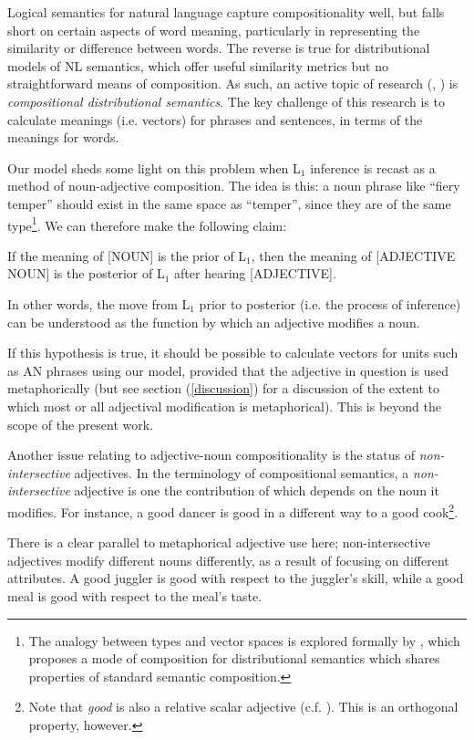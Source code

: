 \documentclass[10pt,letterpaper,twocolumn]{article}
\begin{document}
Logical semantics for natural language capture compositionality well, but falls short on certain aspects of word meaning, particularly in representing the similarity or difference between words. The reverse is true for distributional models of NL semantics, which offer useful similarity metrics but no straightforward means of composition. As such, an active topic of research (\cite{socher2013recursive}, \cite{coecke2010mathematical}) is \emph{compositional distributional semantics}. The key challenge of this research is to calculate meanings (i.e. vectors) for phrases and sentences, in terms of the meanings for words.

Our model sheds some light on this problem when L$_1$ inference is recast as a method of noun-adjective composition. The idea is this: a noun phrase like ``fiery temper'' should exist in the same space as ``temper'', since they are of the same type\footnote{The analogy between types and vector spaces is explored formally by \cite{coecke2010mathematical}, which proposes a mode of composition for distributional semantics which shares properties of standard semantic composition.}. We can therefore make the following claim:
\begin{exe}
\ex If the meaning of [NOUN] is the prior of L$_1$, then the meaning of [ADJECTIVE NOUN] is the posterior of L$_1$ after hearing [ADJECTIVE]. \label{prop1}
\end{exe}

In other words, the move from L$_1$ prior to posterior (i.e. the process of inference) can be understood as the function by which an adjective modifies a noun.

If this hypothesis is true, it should be possible to calculate vectors for units such as AN phrases using our model, provided that the adjective in question is used metaphorically (but see section (\ref{discussion}) for a discussion of the extent to which most or all adjectival modification is metaphorical). This is beyond the scope of the present work.


Another issue relating to adjective-noun compositionality is the status of \emph{non-intersective} adjectives. In the terminology of compositional semantics, a \emph{non-intersective} adjective is one the contribution of which depends on the noun it modifies. For instance, a good dancer is good in a different way to a good cook\footnote{Note that \emph{good} is also a relative scalar adjective (c.f. \cite{kennedy}). This is an orthogonal property, however.}. 

There is a clear parallel to metaphorical adjective use here; non-intersective adjectives modify different nouns differently, as a result of focusing on different attributes. A good juggler is good with respect to the juggler's skill, while a good meal is good with respect to the meal's taste.
\end{document}
